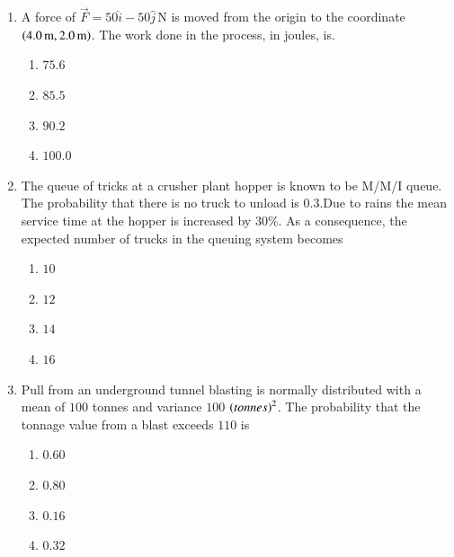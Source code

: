\documentclass[journal,12pt,onecolumn]{IEEEtran}
\theoremstyle{remark}
\begin{document}
\begin{enumerate}
\item A force of $\vec{F} = 50\hat{i} - 50\hat{j} \, \text{N}$ is moved from the origin to the coordinate $\left(4.0\,\text{m}, 2.0\,\text{m}\right)$. The work done in the process, in joules, is.


\hfill{}

\begin{multicols}{4}
\begin{enumerate}
\item $75.6$
\item $85.5$
\item $90.2$
\item $100.0$
\end{enumerate}
\end{multicols}

\item The queue of tricks at a crusher plant hopper is known to be M/M/I queue. The probability that
there is no truck to unload is $0.3$.Due to rains the mean service time at the hopper is increased by $30$\%. As a consequence, the expected number of trucks in the queuing system 
 becomes

\hfill{}

\begin{multicols}{4}
\begin{enumerate}
\item $10$
\item $12$
\item $14$
\item $16$
\end{enumerate}
\end{multicols}

\item Pull from an underground tunnel blasting is normally distributed with a mean of $100$ tonnes and variance $100$ $\left(tonnes\right)^2$. The probability that the tonnage value from a blast exceeds $110$ is


\hfill{}

\begin{multicols}{4}
\begin{enumerate}
\item $0.60 $
\item $0.80$
\item $0.16$
\item $0.32$
\end{enumerate}
\end{multicols}


\end{enumerate}
\end{document}
